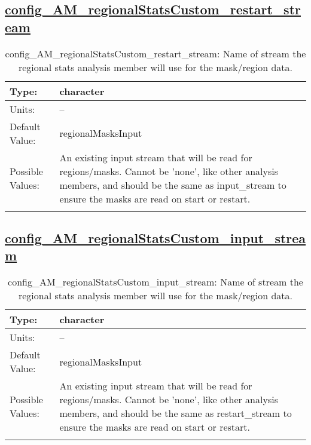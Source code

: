 \subsection[config\_AM\_regionalStatsCustom\_restart\_stream]{\hyperref[sec:nm_tab_AM_regionalStatsCustom]{config\_AM\_regionalStatsCustom\_restart\_stream}}
\label{subsec:nm_sec_config_AM_regionalStatsCustom_restart_stream}
\begin{center}
\begin{longtable}{| p{2.0in} || p{4.0in} |}
    \hline
    Type: & character \\
    \hline
    Units: & -- \\
    \hline
    Default Value: & regionalMasksInput \\
    \hline
    Possible Values: & An existing input stream that will be read for regions/masks. Cannot be 'none', like other analysis members, and should be the same as input\_stream to ensure the masks are read on start or restart. \\
    \hline
    \caption{config\_AM\_regionalStatsCustom\_restart\_stream: Name of stream the regional stats analysis member will use for the mask/region data.}
\end{longtable}
\end{center}
\subsection[config\_AM\_regionalStatsCustom\_input\_stream]{\hyperref[sec:nm_tab_AM_regionalStatsCustom]{config\_AM\_regionalStatsCustom\_input\_stream}}
\label{subsec:nm_sec_config_AM_regionalStatsCustom_input_stream}
\begin{center}
\begin{longtable}{| p{2.0in} || p{4.0in} |}
    \hline
    Type: & character \\
    \hline
    Units: & -- \\
    \hline
    Default Value: & regionalMasksInput \\
    \hline
    Possible Values: & An existing input stream that will be read for regions/masks. Cannot be 'none', like other analysis members, and should be the same as restart\_stream to ensure the masks are read on start or restart. \\
    \hline
    \caption{config\_AM\_regionalStatsCustom\_input\_stream: Name of stream the regional stats analysis member will use for the mask/region data.}
\end{longtable}
\end{center}
